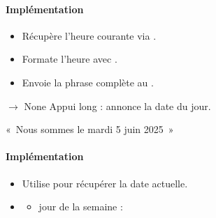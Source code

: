 \documentclass[letterpaper,10pt,french]{sphinxmanual}
\begin{document}
\begin{fulllineitems}
\begin{fulllineitems}
\begin{description}
\end{description}


\paragraph{Implémentation}
\label{\detokenize{api/modes:implementation}}\begin{itemize}
\item {} 
\sphinxAtStartPar
Récupère l’heure courante via .

\item {} 
\sphinxAtStartPar
Formate l’heure avec .

\item {} 
\sphinxAtStartPar
Envoie la phrase complète au .

\end{itemize}

\end{fulllineitems}


\begin{fulllineitems}
\label{\detokenize{api/modes:modes.mode_datetime.ModeDateHeure.on_long_press}}
\pysigstartsignatures
\pysiglinewithargsret
{}
{}
{{ $\rightarrow$ None}}
\pysigstopsignatures
\sphinxAtStartPar
Appui long : annonce la date du jour.
\begin{description}
\sphinxAtStartPar
« Nous sommes le mardi 5 juin 2025 »

\end{description}


\paragraph{Implémentation}
\label{\detokenize{api/modes:id2}}\begin{itemize}
\item {} 
\sphinxAtStartPar
Utilise  pour récupérer la date actuelle.

\item {} \begin{description}
\begin{itemize}
\item {} 
\sphinxAtStartPar
jour de la semaine : 


\end{itemize}
\end{description}
\end{itemize}
\end{fulllineitems}
\end{fulllineitems}
\end{document}
